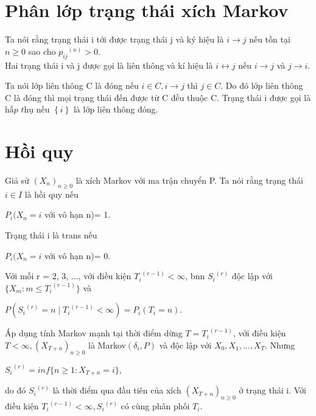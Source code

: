 \section{Phân lớp trạng thái xích Markov}
\dn
Ta nói rằng trạng thái i tới được trạng thái j và ký hiệu là $i \to j $ nếu tồn tại $n\geq 0$ sao cho ${p_{ij}}^{(n)} >  0.$\\
Hai trạng thái i và j được gọi là liên thông và kí hiệu là $i\leftrightarrow j$ nếu $i \to j $ và $j \to i$.
\hdn

Ta nói lớp liên thông C là đóng nếu $i \in C , i \to j $ thì $j \in C$. Do đó lớp liên thông C là đóng thì mọi trạng thái đến được từ C đều thuộc C. Trạng thái i được gọi là $\textit{hấp thụ} $ nếu $\left\{i\right\}$ là lớp liên thông đóng.  

\section{Hồi quy}
\dn
Giả sử $(X_n)_{n\geq 0}$ là xích Markov với ma trận chuyển P. Ta nói rằng trạng thái $i \in I$ là hồi quy nếu
\begin{center}
$P_i(X_n=i$ với vô hạn n)= 1.
\end{center}
Trạng thái i là trans nếu
\begin{center}
$P_i(X_n=i$ với vô hạn n)= 0.
\end{center}
\hdn
\bd\label{bd1.7.1}
Với mỗi r = 2, 3, ..., với điều kiện ${T_i}^{(r-1)} < \infty$, bnn ${S_i}^{(r)}$ độc lập với $\{ X_m : m \leq {T_i}^{(r-1)}\}$ và
\begin{center}
$P({S_i}^{(r)} = n \mid {T_i}^{(r-1)} < \infty) = P_i(T_i= n).$
\end{center}
\hbd
\cm
Áp dụng tính Markov mạnh tại thời điểm dừng $T= {T_i}^{(r-1)}$, với điều kiện $T < \infty , (X_{T + n})_{n\geq0}$ là Markov$(\delta_i, P)$ và độc lập với $X_0, X_1, ...,X_T$. Nhưng
\begin{center}
${S_i}^{(r)} = inf\{n \geq 1: X_{T+n} = i\}$,
\end{center}
do đó ${S_i}^{(r)}$ là thời điểm qua đầu tiên của xích $(X_{T + n})_{n\geq0}$ ở trạng thái i. Với điều kiện ${T_i}^{(r-1)} < \infty, {S_i}^{(r)}$ có cùng phân phối $T_i.$

